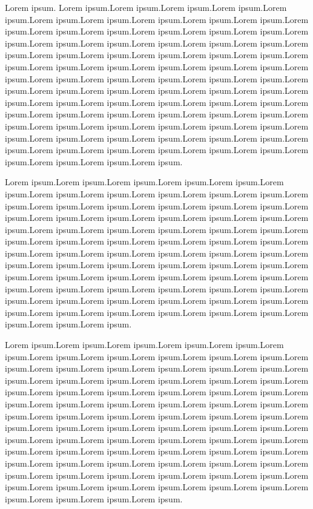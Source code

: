 \documentclass[
  11pt]{article}
\begin{document}
Lorem ipsum. Lorem ipsum.Lorem ipsum.Lorem ipsum.Lorem ipsum.Lorem
ipsum.Lorem ipsum.Lorem ipsum.Lorem ipsum.Lorem ipsum.Lorem ipsum.Lorem
ipsum.Lorem ipsum.Lorem ipsum.Lorem ipsum.Lorem ipsum.Lorem ipsum.Lorem
ipsum.Lorem ipsum.Lorem ipsum.Lorem ipsum.Lorem ipsum.Lorem ipsum.Lorem
ipsum.Lorem ipsum.Lorem ipsum.Lorem ipsum.Lorem ipsum.Lorem ipsum.Lorem
ipsum.Lorem ipsum.Lorem ipsum.Lorem ipsum.Lorem ipsum.Lorem ipsum.Lorem
ipsum.Lorem ipsum.Lorem ipsum.Lorem ipsum.Lorem ipsum.Lorem ipsum.Lorem
ipsum.Lorem ipsum.Lorem ipsum.Lorem ipsum.Lorem ipsum.Lorem ipsum.Lorem
ipsum.Lorem ipsum.Lorem ipsum.Lorem ipsum.Lorem ipsum.Lorem ipsum.Lorem
ipsum.Lorem ipsum.Lorem ipsum.Lorem ipsum.Lorem ipsum.Lorem ipsum.Lorem
ipsum.Lorem ipsum.Lorem ipsum.Lorem ipsum.Lorem ipsum.Lorem ipsum.Lorem
ipsum.Lorem ipsum.Lorem ipsum.Lorem ipsum.Lorem ipsum.Lorem ipsum.Lorem
ipsum.Lorem ipsum.Lorem ipsum.Lorem ipsum.Lorem ipsum.Lorem ipsum.Lorem
ipsum.Lorem ipsum.Lorem ipsum.Lorem ipsum.

Lorem ipsum.Lorem ipsum.Lorem ipsum.Lorem ipsum.Lorem ipsum.Lorem
ipsum.Lorem ipsum.Lorem ipsum.Lorem ipsum.Lorem ipsum.Lorem ipsum.Lorem
ipsum.Lorem ipsum.Lorem ipsum.Lorem ipsum.Lorem ipsum.Lorem ipsum.Lorem
ipsum.Lorem ipsum.Lorem ipsum.Lorem ipsum.Lorem ipsum.Lorem ipsum.Lorem
ipsum.Lorem ipsum.Lorem ipsum.Lorem ipsum.Lorem ipsum.Lorem ipsum.Lorem
ipsum.Lorem ipsum.Lorem ipsum.Lorem ipsum.Lorem ipsum.Lorem ipsum.Lorem
ipsum.Lorem ipsum.Lorem ipsum.Lorem ipsum.Lorem ipsum.Lorem ipsum.Lorem
ipsum.Lorem ipsum.Lorem ipsum.Lorem ipsum.Lorem ipsum.Lorem ipsum.Lorem
ipsum.Lorem ipsum.Lorem ipsum.Lorem ipsum.Lorem ipsum.Lorem ipsum.Lorem
ipsum.Lorem ipsum.Lorem ipsum.Lorem ipsum.Lorem ipsum.Lorem ipsum.Lorem
ipsum.Lorem ipsum.Lorem ipsum.Lorem ipsum.Lorem ipsum.Lorem ipsum.Lorem
ipsum.Lorem ipsum.Lorem ipsum.Lorem ipsum.Lorem ipsum.Lorem ipsum.Lorem
ipsum.Lorem ipsum.Lorem ipsum.

Lorem ipsum.Lorem ipsum.Lorem ipsum.Lorem ipsum.Lorem ipsum.Lorem
ipsum.Lorem ipsum.Lorem ipsum.Lorem ipsum.Lorem ipsum.Lorem ipsum.Lorem
ipsum.Lorem ipsum.Lorem ipsum.Lorem ipsum.Lorem ipsum.Lorem ipsum.Lorem
ipsum.Lorem ipsum.Lorem ipsum.Lorem ipsum.Lorem ipsum.Lorem ipsum.Lorem
ipsum.Lorem ipsum.Lorem ipsum.Lorem ipsum.Lorem ipsum.Lorem ipsum.Lorem
ipsum.Lorem ipsum.Lorem ipsum.Lorem ipsum.Lorem ipsum.Lorem ipsum.Lorem
ipsum.Lorem ipsum.Lorem ipsum.Lorem ipsum.Lorem ipsum.Lorem ipsum.Lorem
ipsum.Lorem ipsum.Lorem ipsum.Lorem ipsum.Lorem ipsum.Lorem ipsum.Lorem
ipsum.Lorem ipsum.Lorem ipsum.Lorem ipsum.Lorem ipsum.Lorem ipsum.Lorem
ipsum.Lorem ipsum.Lorem ipsum.Lorem ipsum.Lorem ipsum.Lorem ipsum.Lorem
ipsum.Lorem ipsum.Lorem ipsum.Lorem ipsum.Lorem ipsum.Lorem ipsum.Lorem
ipsum.Lorem ipsum.Lorem ipsum.Lorem ipsum.Lorem ipsum.Lorem ipsum.Lorem
ipsum.Lorem ipsum.Lorem ipsum.Lorem ipsum.Lorem ipsum.Lorem ipsum.Lorem
ipsum.Lorem ipsum.Lorem ipsum.Lorem ipsum.
\end{document}
